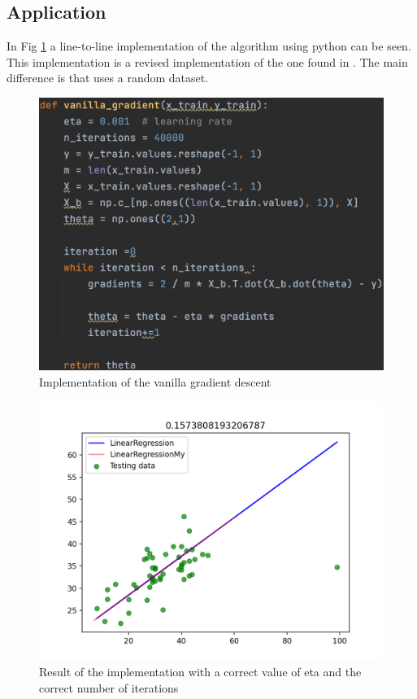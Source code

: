 \documentclass[conference]{IEEEtran}
\begin{document}
\subsection{Application}
In Fig \ref{fig:va_gr} a line-to-line implementation of the algorithm using python can be seen. This implementation is a revised implementation of the one found in \cite{Scikit-Learn}. The main difference is that \cite{Scikit-Learn} uses a random dataset. 
\begin{figure}[ht]
    \includegraphics[scale=0.4]{vanilla_gradient.png}
    \caption{Implementation of the vanilla gradient descent}
    \label{fig:va_gr}
\end{figure}

\begin{figure}[ht]
    \includegraphics[scale=0.5]{Figure_1.png}
    \caption{Result of the implementation with a correct value of eta and the correct number of iterations}
    \label{fig:va_gr_ben}
\end{figure}
\end{document}
